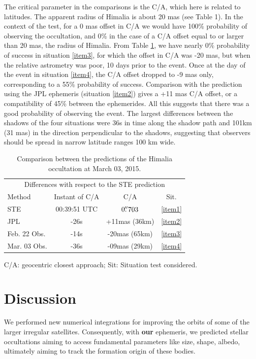 \documentclass[useAMS,usenatbib]{mn2e}
\begin{document}
The critical parameter in the comparisons is the C/A, which here is related to latitudes. The apparent radius of Himalia is about 20 mas (see Table 1). In the context of the test, for a 0 mas offset in C/A we would have 100\% probability of observing the occultation, and 0\% in the case of a C/A offset equal to or larger than 20 mas, the radius of Himalia. From Table \ref{Tab: comparison-Himalia}, we have nearly 0\% probability of success in situation \ref{item3}, for which the offset in C/A was -20 mas, but when the relative astrometry was poor, 10 days prior to the event. Once at the day of the event in situation \ref{item4}, the C/A offset dropped to -9 mas only, corresponding to a 55\% probability of success. Comparison with the prediction using the JPL ephemeris (situation \ref{item2}) gives a +11 mas C/A offset, or a compatibility of 45\% between the ephemerides. All this suggests that there was a good probability of observing the event. The largest differences between the shadows of the four situations were 36s in time along the shadow path and 101km (31 mas) in the direction perpendicular to the shadows, suggesting that observers should be spread in narrow latitude ranges 100 km wide.

\begin{table}
\caption{\label{Tab: comparison-Himalia} Comparison between the predictions of the Himalia occultation at March 03, 2015.}
\begin{centering}
\begin{tabular}{lccc}
\hline  \hline
\multicolumn{4}{c}{Differences with respect to the STE prediction} \tabularnewline
Method  & Instant of C/A  & C/A & Sit.   \tabularnewline
\hline
STE & 00:39:51 UTC & $0\hbox{$.\!\!^{\prime\prime}$}703$ & \ref{item1} \tabularnewline
JPL & -26s & +11mas (36km) & \ref{item2} \tabularnewline %
Feb. 22 Obs. & -14s & -20mas (65km) & \ref{item3} \tabularnewline %
Mar. 03 Obs. & -36s & -09mas (29km) & \ref{item4} \tabularnewline %
\hline
\end{tabular}
\par\end{centering}
C/A: geocentric closest approach; Sit: Situation test considered.
\end{table}

\section{Discussion} \label{Sec: discussion}

We performed new numerical integrations for improving the orbits of some of the larger irregular satellites. Consequently, with \textbf{our} ephemeris, we predicted stellar occultations aiming to access fundamental parameters like size, shape, albedo, ultimately aiming to track the formation origin of these bodies.
\end{document}
